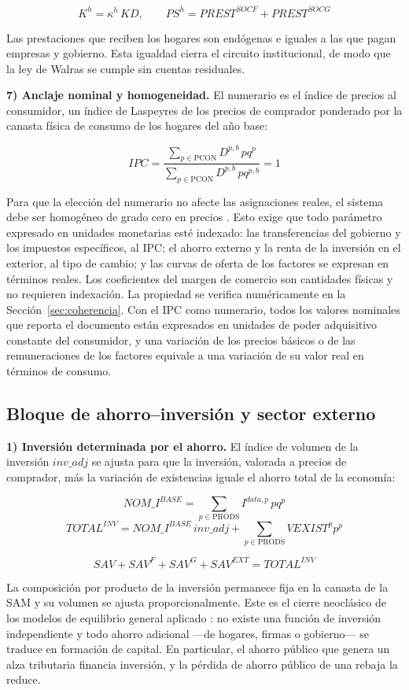 \documentclass[11pt]{article}
\begin{document}
\[
K^{h}=\kappa^{h}\,KD, \qquad PS^{h}=PREST^{SOCF}+PREST^{SOCG}
\]

Las prestaciones que reciben los hogares son endógenas e iguales a las que pagan empresas y gobierno. Esta igualdad cierra el circuito institucional, de modo que la ley de Walras se cumple sin cuentas residuales.

\textbf{7) Anclaje nominal y homogeneidad.} El numerario es el índice de precios al consumidor, un índice de Laspeyres de los precios de comprador ponderado por la canasta física de consumo de los hogares del año base:

\[
IPC=\frac{\sum_{p\in \mathrm{PCON}} D^{p,b}\,pq^{p}}{\sum_{p\in \mathrm{PCON}} D^{p,b}\,pq^{p,b}}=1
\]

Para que la elección del numerario no afecte las asignaciones reales, el sistema debe ser homogéneo de grado cero en precios \cite{dewatripont_michel_1987}. Esto exige que todo parámetro expresado en unidades monetarias esté indexado: las transferencias del gobierno y los impuestos específicos, al IPC; el ahorro externo y la renta de la inversión en el exterior, al tipo de cambio; y las curvas de oferta de los factores se expresan en términos reales. Los coeficientes del margen de comercio son cantidades físicas y no requieren indexación. La propiedad se verifica numéricamente en la Sección~\ref{sec:coherencia}. Con el IPC como numerario, todos los valores nominales que reporta el documento están expresados en unidades de poder adquisitivo constante del consumidor, y una variación de los precios básicos o de las remuneraciones de los factores equivale a una variación de su valor real en términos de consumo.

\subsection{Bloque de ahorro--inversión y sector externo}
\label{sec:ahorro-inversion}

\textbf{1) Inversión determinada por el ahorro.} El índice de volumen de la inversión $inv\_adj$ se ajusta para que la inversión, valorada a precios de comprador, más la variación de existencias iguale el ahorro total de la economía:

\[
NOM\_I^{BASE}=\sum_{p\in\mathrm{PRODS}} I^{data,p}\,pq^{p}
\]
\[
TOTAL^{INV}=NOM\_I^{BASE}\,inv\_adj+\sum_{p\in\mathrm{PRODS}}VEXIST^{p}p^{p}
\]

\[
SAV+SAV^{F}+SAV^{G}+SAV^{EXT}=TOTAL^{INV}
\]

La composición por producto de la inversión permanece fija en la canasta de la SAM y su volumen se ajusta proporcionalmente. Este es el cierre neoclásico de los modelos de equilibrio general aplicado \cite{sen_1963,lofgren_harris_robinson_2002}: no existe una función de inversión independiente y todo ahorro adicional ---de hogares, firmas o gobierno--- se traduce en formación de capital. En particular, el ahorro público que genera un alza tributaria financia inversión, y la pérdida de ahorro público de una rebaja la reduce.
\end{document}
